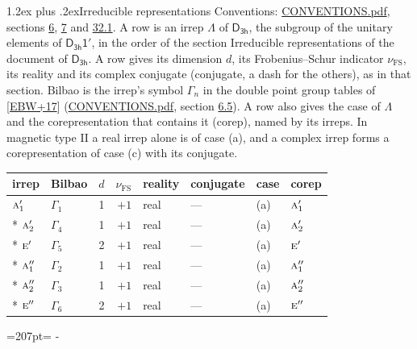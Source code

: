 \documentclass[10pt,a4paper]{article}
\makeatletter
\renewcommand\section{\@startsection{section}{1}{\z@}{-3ex plus -1ex minus -.2ex}%
  {1.2ex plus .2ex}{\normalfont\large\sffamily\bfseries\color{parttitle}}}
\newcommand{\needspace}[1]{\par\penalty-100\begingroup\dimen0=#1\relax\dimen2=\pagegoal
  \advance\dimen2-\pagetotal\ifdim\dimen0>\dimen2\relax\ifdim\dimen2>0pt\vfil\break\fi\fi
  \endgroup}
\numberwithin{equation}{section}
\newcommand{\grp}[1]{\mathsf{#1}}
\newcommand{\irr}[1]{\text{\normalfont\scshape #1}}
\newcommand{\fsind}{\nu_{\mathrm{FS}}}
\makeatother
\begin{document}
\section{Irreducible representations}\label{s:irreps}
Conventions: \href{../../CONVENTIONS.pdf}{CONVENTIONS.pdf}, sections \href{../../../rotation/CONVENTIONS.pdf\#conv.6}{6}, \href{../../../rotation/CONVENTIONS.pdf\#conv.7}{7} and \href{../../CONVENTIONS.pdf\#conv.32.1}{32.1}.
\leavevmode\label{n:irrep.Delta}A row is an irrep $\Lambda$ of $\grp{D_{3h}}$, the subgroup of the unitary elements of $\grp{D_{3h}1'}$, in the order of the section Irreducible representations of the document of \href{../../../rotation/data/pdf/D3h.pdf}{$\grp{D_{3h}}$}. \label{n:index.dimension}\label{n:index.frobenius}\label{n:head.irrep}\label{n:head.reality}\label{n:head.conjugate}A row gives its dimension $d$, its Frobenius--Schur indicator $\fsind$, its reality and its complex conjugate (conjugate, a dash for the others), as in that section. \label{n:head.bilbao}\label{n:irrep.alias.gamma}Bilbao is the irrep's symbol $\Gamma_n$ in the double point group tables of [\href{../../../REFERENCES.pdf\#ref.EBW+17}{EBW+17}] (\href{../../CONVENTIONS.pdf}{CONVENTIONS.pdf}, section \href{../../../rotation/CONVENTIONS.pdf\#conv.6.5}{6.5}). \label{n:head.case.corep}\label{n:head.corep}A row also gives the case of $\Lambda$ and the corepresentation that contains it (corep), named by its irreps. In magnetic type II a real irrep alone is of case (a), and a complex irrep forms a corepresentation of case (c) with its conjugate.
\setlength{\emergencystretch}{2em}\par\setlength{\emergencystretch}{0pt}
{\small\renewcommand{\arraystretch}{1.25}\setlength{\tabcolsep}{4pt}\begin{longtable}{@{}llrrllll@{}}\toprule
irrep & Bilbao & $d$ & $\fsind$ & reality & conjugate & case & corep\\\midrule\endhead
\bottomrule\endfoot\endlastfoot
$\irr{a}_{1}'$ & $\Gamma_{1}$ & 1 & $+1$ & real & --- & (a) & $\irr{a}_{1}'$\\*
$\irr{a}_{2}'$ & $\Gamma_{4}$ & 1 & $+1$ & real & --- & (a) & $\irr{a}_{2}'$\\*
$\irr{e}'$ & $\Gamma_{5}$ & 2 & $+1$ & real & --- & (a) & $\irr{e}'$\\*
$\irr{a}_{1}''$ & $\Gamma_{2}$ & 1 & $+1$ & real & --- & (a) & $\irr{a}_{1}''$\\*
$\irr{a}_{2}''$ & $\Gamma_{3}$ & 1 & $+1$ & real & --- & (a) & $\irr{a}_{2}''$\\*
$\irr{e}''$ & $\Gamma_{6}$ & 2 & $+1$ & real & --- & (a) & $\irr{e}''$\\
\bottomrule\end{longtable}}
\needspace{207pt}
\end{document}
